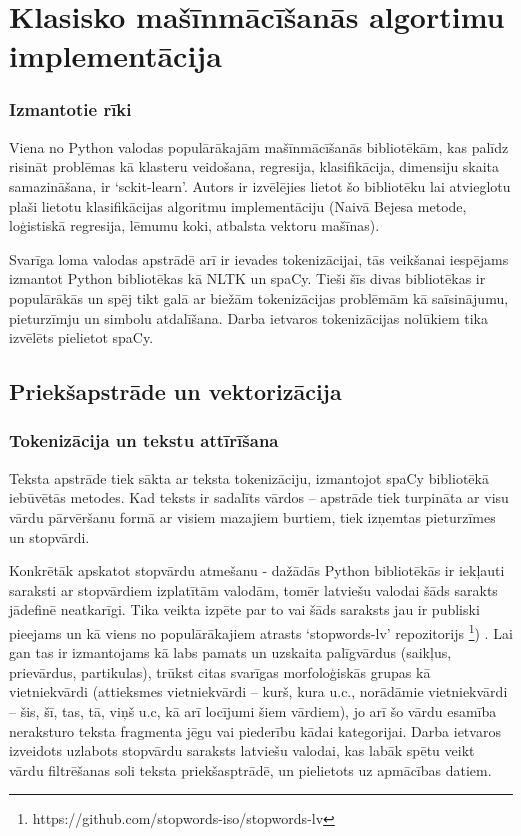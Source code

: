 \section{Klasisko mašīnmācīšanās algortimu implementācija}

\subsubsection{Izmantotie rīki}
Viena no Python valodas populārākajām mašīnmācīšanās bibliotēkām, kas palīdz risināt problēmas kā klasteru veidošana, regresija, klasifikācija, dimensiju skaita samazināšana, ir ‘sckit-learn’. Autors ir izvēlējies lietot šo bibliotēku lai atvieglotu plaši lietotu klasifikācijas algoritmu implementāciju (Naivā Bejesa metode, loģistiskā regresija, lēmumu koki,  atbalsta vektoru mašīnas). 

Svarīga loma valodas apstrādē arī ir ievades tokenizācijai, tās veikšanai iespējams izmantot Python bibliotēkas kā NLTK un spaCy. Tieši šīs divas bibliotēkas ir populārākās un spēj tikt galā ar biežām tokenizācijas problēmām kā saīsinājumu, pieturzīmju un simbolu atdalīšana. Darba ietvaros tokenizācijas nolūkiem tika izvēlēts pielietot spaCy.

\subsection{Priekšapstrāde un vektorizācija}
\subsubsection{Tokenizācija un tekstu attīrīšana}
Teksta apstrāde tiek sākta ar teksta tokenizāciju, izmantojot spaCy bibliotēkā iebūvētās metodes. Kad teksts ir sadalīts vārdos – apstrāde tiek turpināta ar visu vārdu pārvēršanu formā ar visiem mazajiem burtiem, tiek izņemtas pieturzīmes un stopvārdi.

Konkrētāk apskatot stopvārdu atmešanu - dažādās Python bibliotēkās ir iekļauti saraksti ar stopvārdiem izplatītām valodām, tomēr latviešu valodai šāds sarakts jādefinē neatkarīgi. Tika veikta izpēte par to vai šāds saraksts jau ir publiski pieejams un kā viens no populārākajiem atrasts ‘stopwords-lv’ repozitorijs \footnote{https://github.com/stopwords-iso/stopwords-lv}) . Lai gan tas ir izmantojams kā labs pamats un uzskaita palīgvārdus (saikļus, prievārdus, partikulas), trūkst citas svarīgas morfoloģiskās grupas kā vietniekvārdi (attieksmes vietniekvārdi – kurš, kura u.c., norādāmie vietniekvārdi – šis, šī, tas, tā, viņš u.c, kā arī locījumi šiem vārdiem), jo arī šo vārdu esamība neraksturo teksta fragmenta jēgu vai piederību kādai kategorijai. Darba ietvaros izveidots uzlabots stopvārdu saraksts latviešu valodai, kas labāk spētu veikt vārdu filtrēšanas soli teksta priekšasptrādē, un pielietots uz apmācības datiem. 

